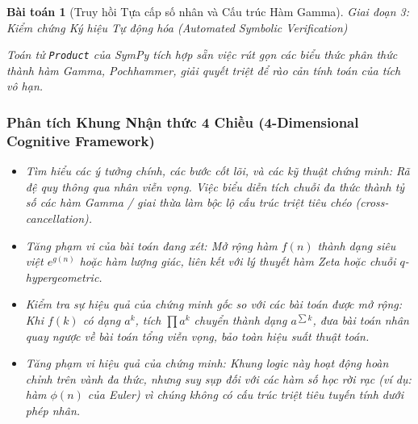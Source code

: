 \documentclass{article}
\newtheorem{baitoan}{Bài toán}
\begin{document}
\begin{baitoan}[Truy hồi Tựa cấp số nhân và Cấu trúc Hàm Gamma]


\vspace{0.5em}\noindent\emph{Giai đoạn 3: Kiểm chứng Ký hiệu Tự động hóa (Automated Symbolic Verification)}
 
 Toán tử \texttt{Product} của \textsf{SymPy} tích hợp sẵn việc rút gọn các biểu thức phân thức thành hàm Gamma, Pochhammer, giải quyết triệt để rào cản tính toán của tích vô hạn.



 \subsubsection*{Phân tích Khung Nhận thức 4 Chiều (4-Dimensional Cognitive Framework)}
 \begin{itemize}
 \item \textit{Tìm hiểu các ý tưởng chính, các bước cốt lõi, và các kỹ thuật chứng minh}: Rã đệ quy thông qua nhân viễn vọng. Việc biểu diễn tích chuỗi đa thức thành tỷ số các hàm Gamma / giai thừa làm bộc lộ cấu trúc triệt tiêu chéo (cross-cancellation).
 \item \textit{Tăng phạm vi của bài toán đang xét}: Mở rộng hàm $f(n)$ thành dạng siêu việt $e^{g(n)}$ hoặc hàm lượng giác, liên kết với lý thuyết hàm Zeta hoặc chuỗi $q$-hypergeometric.
 \item \textit{Kiểm tra sự hiệu quả của chứng minh gốc so với các bài toán được mở rộng}: Khi $f(k)$ có dạng $a^k$, tích $\prod a^k$ chuyển thành dạng $a^{\sum k}$, đưa bài toán nhân quay ngược về bài toán tổng viễn vọng, bảo toàn hiệu suất thuật toán.
 \item \textit{Tăng phạm vi hiệu quả của chứng minh}: Khung logic này hoạt động hoàn chỉnh trên vành đa thức, nhưng suy sụp đối với các hàm số học rời rạc (ví dụ: hàm $\phi(n)$ của Euler) vì chúng không có cấu trúc triệt tiêu tuyến tính dưới phép nhân.
 \end{itemize}
\end{baitoan}

\end{document}
